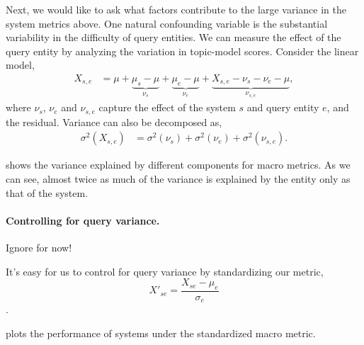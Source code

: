 Next, we would like to ask what factors contribute to the large variance in the system metrics above.
One natural confounding variable is the substantial variability in the difficulty of query entities.
We can measure the effect of the query entity by analyzing the variation in topic-model scores.
Consider the linear model,
\begin{align*}
  X_{s,e} &= \mu 
    + \underbrace{\mu_{s} - \mu}_{\nu_{s}}
    + \underbrace{\mu_{e} - \mu}_{\nu_{e}}
    + \underbrace{X_{s,e} - \nu_{s} - \nu_{e} - \mu}_{\nu_{s,e}},
\end{align*}
where $\nu_{s}$, $\nu_{e}$ and $\nu_{s,e}$ capture the effect of the system $s$ and query entity $e$, and the residual.
Variance can also be decomposed as,
\begin{align*}
  \sigma^2(X_{s,e}) &= \sigma^2(\nu_s) + \sigma^2(\nu_e) + \sigma^2(\nu_{s,e}).
\end{align*}

\tableref{} shows the variance explained by different components for macro metrics. As we can see, almost twice as much of the variance is explained by the entity only as that of the system.


\paragraph{Controlling for query variance.}
\ac{Ignore for now!}

It's easy for us to control for query variance by standardizing our metric,  
$$X'_{se} = \frac{X_{se} - \mu_e}{\sigma_e}$$.

 plots the performance of systems under the standardized macro \fone metric.


